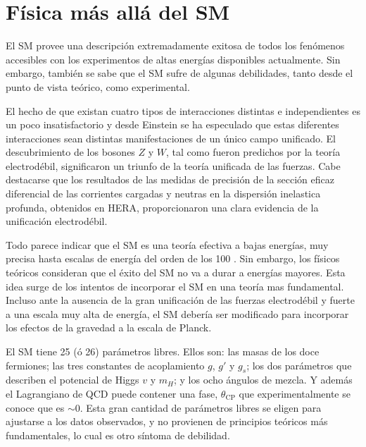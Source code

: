 \section{Física más allá del SM}

El SM provee una descripción extremadamente exitosa de todos los fenómenos
accesibles con los experimentos de altas energías disponibles actualmente.
Sin embargo,
también se sabe que el SM sufre de algunas debilidades, tanto desde el punto de
vista teórico, como experimental.

El hecho de que existan cuatro tipos de interacciones distintas e independientes
es un poco insatisfactorio y desde Einstein se ha especulado que estas
diferentes interacciones sean distintas manifestaciones de un único campo
unificado. El descubrimiento de los bosones $Z$ y $W$, tal como fueron predichos
por la teoría electrodébil, significaron un triunfo de la teoría unificada de las
fuerzas. Cabe destacarse que los resultados de las medidas de precisión de la sección
eficaz diferencial de las corrientes cargadas y neutras en la dispersión inelastica
profunda, obtenidos en HERA, proporcionaron una clara evidencia de la unificación
electrodébil.

Todo parece indicar que el SM es una teoría efectiva a bajas energías, muy precisa hasta
escalas de energía del orden de los 100 {\gev}. Sin embargo, los físicos
teóricos consideran que el éxito del SM no va a durar a energías mayores. Esta
idea surge de los intentos de incorporar el SM en una teoría mas
fundamental. Incluso ante la ausencia de la gran unificación de las fuerzas
electrodébil y fuerte a una escala muy alta de energía, el SM debería ser
modificado para incorporar los efectos de la gravedad a la escala de Planck.

El SM tiene 25 (ó 26) parámetros libres. Ellos son: las masas de los doce fermiones;
las tres constantes de acoplamiento $g$, $g'$ y $g_s$; los dos parámetros que
describen el potencial de Higgs $v$ y $m_H$; y los ocho ángulos de mezcla. Y
además el Lagrangiano de QCD puede contener una fase, $\theta_{\text{CP}}$ que
experimentalmente se conoce que es $\sim 0$. Esta gran cantidad de parámetros
libres se eligen para ajustarse a los datos observados, y no provienen de
principios teóricos más fundamentales, lo cual es otro síntoma de debilidad.

